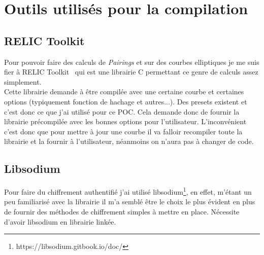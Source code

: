 \chapter{Outils utilisés pour la compilation}

\section{RELIC Toolkit}
Pour pouvoir faire des calculs de \textit{Pairings} et sur des courbes elliptiques je me suis fier à RELIC Toolkit~\cite{relic-toolkit} qui est une librairie C permettant ce genre de calculs assez simplement.\\
Cette librairie demande à être compilée avec une certaine courbe et certaines options (typiquement fonction de hachage et autres...). Des presets existent et c'est donc ce que j'ai utilisé pour ce POC. Cela demande donc de fournir la librairie précompilée avec les bonnes options pour l'utilisateur. L'inconvénient c'est donc que pour mettre à jour une courbe il va falloir recompiler toute la librairie et la fournir à l'utilisateur, néanmoins on n'aura pas à changer de code.

\section{Libsodium}
Pour faire du chiffrement authentifié j'ai utilisé libsodium\footnote{https://libsodium.gitbook.io/doc/}, en effet, m'étant un peu familiarisé avec la librairie il m'a semblé être le choix le plus évident en plus de fournir des méthodes de chiffrement simples à mettre en place. Nécessite d'avoir libsodium en librairie linkée.